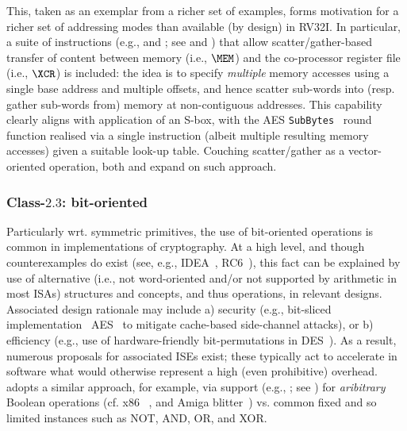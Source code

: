 This, taken as an exemplar from a richer set of examples, forms motivation
for a richer set of addressing modes than available (by design) in RV32I.
In particular, 
a suite of instructions 
(e.g.,  and ; see  and )
that allow 
scatter/gather-based
transfer of content between
   memory                         (i.e., $\MEM$)
and
the    co-processor register file (i.e., $\XCR$)
is included: the idea is to specify {\em multiple} memory accesses using a
single base address and multiple offsets, and hence scatter sub-words into 
(resp. gather sub-words from) memory at non-contiguous addresses.  
This capability clearly aligns with application of an S-box, with the AES 
{\tt SubBytes}~\cite[Section 5.1.1]{SCARV:FIPS:197} 
round function realised via a single  instruction 
(albeit multiple resulting memory accesses) given a suitable look-up table.
Couching scatter/gather as a vector-oriented operation, both
\cite[Section 3.1]{SCARV:FouMoo:05} 
and 
\cite[Section 3.3]{SCARV:Fournier:07}
expand on such approach.


\subsubsection{Class-$2.3$: bit-oriented}
\label{sec:bg:feature:2:3}

Particularly wrt. symmetric primitives, the use of bit-oriented operations 
is common in implementations of cryptography.  At a high level, and though 
counterexamples do exist 
(see, e.g., IDEA~\cite{SCARV:LaiMas:90}, RC6~\cite{SCARV:RRSY:98}),
this fact can be explained by use of alternative (i.e., not word-oriented
and/or not supported by arithmetic in most ISAs) structures and concepts,
and thus operations, in relevant designs.  Associated design rationale may
include
a) security
   (e.g., bit-sliced implementation~\cite{SCARV:KasSch:09} AES~\cite{SCARV:FIPS:197} to mitigate cache-based side-channel attacks),
   or
b) efficiency
   (e.g., use of hardware-friendly bit-permutations in DES~\cite{SCARV:FIPS:46_3}).
As a result, numerous proposals for associated ISEs exist; these typically
act to accelerate in software what would otherwise represent a high (even 
prohibitive) overhead.  \XCID adopts a similar approach, for example, via
support
(e.g., ; see )
for {\em aribitrary} Boolean operations
(cf. x86 ~\cite[5-446--5-468]{SCARV:X86:2:18}, and Amiga blitter~\cite[Chapter 6]{SCARV:Amiga:85})
vs. common fixed and so limited instances such as NOT, AND, OR, and XOR.


